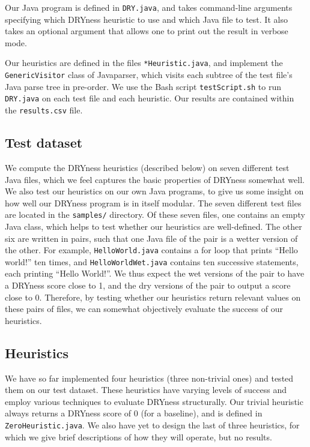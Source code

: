 \documentclass{article}
\begin{document}
Our Java program is defined in \texttt{DRY.java}, and takes command-line arguments specifying which DRYness heuristic to use
and which Java file to test. It also takes an optional argument that allows one to print out the result in verbose mode.

Our heuristics are defined in the files \texttt{*Heuristic.java}, and implement the \texttt{GenericVisitor} class of Javaparser, 
which visits each subtree of the test file's Java parse tree in pre-order. We use the Bash script \texttt{testScript.sh} to run
\texttt{DRY.java} on each test file and each heuristic. Our results are contained within the \texttt{results.csv} file.

\subsection{Test dataset}

We compute the DRYness heuristics (described below) on seven different test Java files, which we feel captures the basic properties
of DRYness somewhat well. We also test our heuristics on our own Java programs, to give us some insight on how well our DRYness
program is in itself modular. The seven different test files are located in the \texttt{samples/} directory. Of these seven files, one contains an empty Java class, which helps to test whether our heuristics are well-defined. The other six are written in pairs,
such that one Java file of the pair is a wetter version of the other. For example, \texttt{HelloWorld.java} contains a for loop
that prints ``Hello world!'' ten times, and \texttt{HelloWorldWet.java} contains ten successive statements, each printing
``Hello World!''. We thus expect the wet versions of the pair to have a DRYness score close to 1, and the dry versions of the pair
to output a score close to 0. Therefore, by testing whether our heuristics return relevant values on these pairs of files,
we can somewhat objectively evaluate the success of our heuristics.

\subsection{Heuristics}

We have so far implemented four heuristics (three non-trivial ones) and tested them on our test dataset. These heuristics have varying levels of success
and employ various techniques to evaluate DRYness structurally. Our trivial heuristic always returns a DRYness score of 0 (for a
baseline), and is defined in \texttt{ZeroHeuristic.java}. We also have yet to design the last of three heuristics,
for which we give brief descriptions of how they will operate, but no results.
\end{document}
